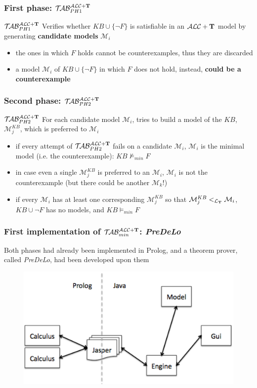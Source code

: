 \documentclass[serif,mathserif]{beamer}
\newcommand{\tip}{{\bf T}}
\newcommand{\alct}{\mathcal{ALC}+\tip}
\newcommand{\nuovoc}{\mathrel{{\mathcal{T}\!\mathcal{AB}}}_{min}^{\mathcal{ALC}+\mbox{\scriptsize $\tip$}}}
\newcommand{\primo}{\mathrel{{\mathcal{T}\!\mathcal{AB}}}_{\scriptsize PH 1}^{\mathcal{ALC}+\mbox{\scriptsize $\tip$}}}
\newcommand{\secondo}{\mathrel{{\mathcal{T}\!\mathcal{AB}}}_{\scriptsize PH 2}^{\mathcal{ALC}+\mbox{\scriptsize $\tip$}}}
\newcommand{\LT}{\mathcal{L_\tip}}
\begin{document}
\begin{frame}
	\frametitle{First phase: $\primo$}
	\begin{block}{$\primo$}
	Verifies whether $KB \cup \{\neg F\}$ is satisfiable in an $\alct$ model by generating \textbf{candidate models} $\mathcal{M}_i$
	\begin{itemize}
	\item the ones in which $F$ holds cannot be counterexamples, thus they are discarded
	\item a model $\mathcal{M}_i$ of $KB \cup \{\neg F\}$ in which $F$ does not hold, instead, \textbf{could be a counterexample}
	\end{itemize}
	\end{block}
\end{frame}

\begin{frame}
	\frametitle{Second phase: $\secondo$}
	\begin{block}{$\secondo$}
	For each candidate model $\mathcal{M}_i$, tries to build a model of the $KB$, $\mathcal{M}_j^{KB}$, which is preferred to $\mathcal{M}_i$
	\begin{itemize} 
	\item if every attempt of $\secondo$ fails on a candidate $\mathcal{M}_i$, $\mathcal{M}_i$ is the minimal model (i.e. the counterexample): $KB \not\models_{min} F$
	\item in case even a single $\mathcal{M}_j^{KB}$ is preferred to an $\mathcal{M}_i$, $\mathcal{M}_i$ is not the counterexample (but there could be another $\mathcal{M}_k$!)
	\item if every $\mathcal{M}_i$ has at least one corresponding $\mathcal{M}_j^{KB}$ so that $\mathcal{M}_j^{KB} <_\LT \mathcal{M}_i$, $KB \cup \neg F$ has no models, and $KB \models_{min} F$\\
	\end{itemize}
	\end{block}
\end{frame}


\begin{frame}
	\frametitle{First implementation of $\nuovoc$: \emph{PreDeLo}}
	Both phases had already been implemented in Prolog, and a theorem prover, called \emph{PreDeLo}, had been developed upon them

\begin{figure}[htp]
\centering
\includegraphics[scale=.30]{img/predelo.png}
\end{figure}
\end{frame}
\end{document}

